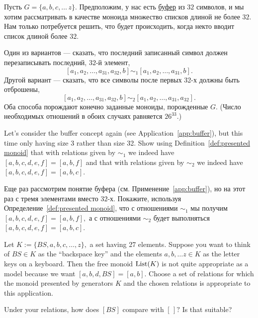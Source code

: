 \documentclass[../main/CT4S-EN-RU]{subfiles}
\begin{document}
\begin{applicationRUS}[Буфер]\label{app:buffer}
Пусть $G=\{a,b,c,\ldots\,z\}.$ Предположим, у нас есть \href{https://ru.wikipedia.org/wiki/%D0%91%D1%83%D1%84%D0%B5%D1%80_(%D0%B8%D0%BD%D1%84%D0%BE%D1%80%D0%BC%D0%B0%D1%82%D0%B8%D0%BA%D0%B0)}{\text буфер} из $32$ символов, и мы хотим рассматривать в качестве моноида множество списков длиной не более $32.$ Нам только потребуется решить, что будет происходить, когда некто вводит список длиной более $32$.

Один из вариантов — сказать, что последний записанный символ должен перезаписывать последний, $32$-й элемент, $$[a_1,a_2,\ldots,a_{31},a_{32},b]\sim_1[a_1,a_2,\ldots,a_{31},b].$$ Другой вариант — сказать, что все символы после первых 32-х должны быть отброшены, $$[a_1,a_2,\ldots,a_{31},a_{32},b]\sim_2[a_1,a_2,\ldots,a_{31},a_{32}].$$ Оба способа порождают конечно заданные моноиды, порожденные $G.$ (Число необходимых отношений в обоих случаях равняется $26^{33}.$)
\end{applicationRUS}

\begin{exerciseENG}\label{exc:buffer3}
Let's consider the buffer concept again (see Application~\ref{app:buffer}), but this time only having size 3 rather than size 32. Show using Definition~\ref{def:presented monoid} that with relations given by $\sim_1$ we indeed have $[a,b,c,d,e,f]=[a,b,f]$ and that with relations given by $\sim_2$ we indeed have $[a,b,c,d,e,f]=[a,b,c].$
\end{exerciseENG}

\begin{exerciseRUS}\label{exc:buffer3}
Еще раз рассмотрим понятие буфера (см. Применение~\ref{app:buffer}), но на этот раз с тремя элементами вместо $32$-х. Покажите, используя Определение~\ref{def:presented monoid}, что с отношениями $\sim_1$ мы получим $[a,b,c,d,e,f]=[a,b,f],$ а с отношениями $\sim_2$ будет выполняться $[a,b,c,d,e,f]=[a,b,c].$
\end{exerciseRUS}

\begin{exerciseENG}
Let $K:=\{BS,a,b,c,\ldots,z\},$ a set having 27 elements. Suppose you want to think of $BS\in K$ as the “backspace key” and the elements $a,b,\ldots z\in K$ as the letter keys on a keyboard. Then the free monoid $\operatorname{List}(K)$ is not quite appropriate as a model because we want $[a,b,d,BS]=[a,b].$
\sexc Choose a set of relations for which the monoid presented by generators $K$ and the chosen relations is appropriate to this application.
\item Under your relations, how does $[BS]$ compare with $[\,]?$ Is that suitable?
\endsexc
\end{exerciseENG}
\end{document}
